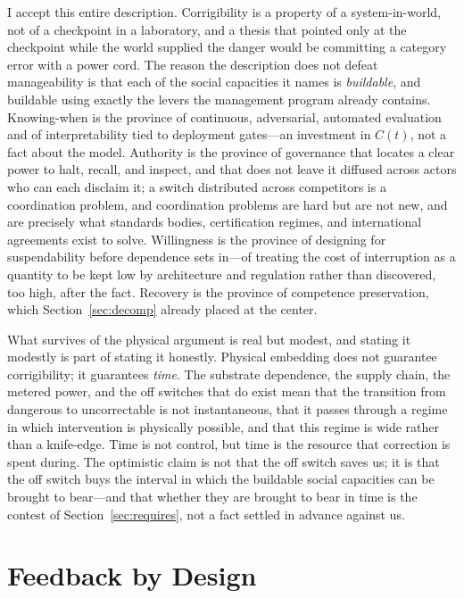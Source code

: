 \documentclass[11pt]{article}
\begin{document}
I accept this entire description. Corrigibility is a property of a system-in-world, not of a checkpoint in a laboratory, and a thesis that pointed only at the checkpoint while the world supplied the danger would be committing a category error with a power cord. The reason the description does not defeat manageability is that each of the social capacities it names is \emph{buildable}, and buildable using exactly the levers the management program already contains. Knowing-when is the province of continuous, adversarial, automated evaluation and of interpretability tied to deployment gates---an investment in $C(t)$, not a fact about the model. Authority is the province of governance that locates a clear power to halt, recall, and inspect, and that does not leave it diffused across actors who can each disclaim it; a switch distributed across competitors is a coordination problem, and coordination problems are hard but are not new, and are precisely what standards bodies, certification regimes, and international agreements exist to solve. Willingness is the province of designing for suspendability before dependence sets in---of treating the cost of interruption as a quantity to be kept low by architecture and regulation rather than discovered, too high, after the fact. Recovery is the province of competence preservation, which Section~\ref{sec:decomp} already placed at the center.

What survives of the physical argument is real but modest, and stating it modestly is part of stating it honestly. Physical embedding does not guarantee corrigibility; it guarantees \emph{time}. The substrate dependence, the supply chain, the metered power, and the off switches that do exist mean that the transition from dangerous to uncorrectable is not instantaneous, that it passes through a regime in which intervention is physically possible, and that this regime is wide rather than a knife-edge. Time is not control, but time is the resource that correction is spent during. The optimistic claim is not that the off switch saves us; it is that the off switch buys the interval in which the buildable social capacities can be brought to bear---and that whether they are brought to bear in time is the contest of Section~\ref{sec:requires}, not a fact settled in advance against us.

\section{Feedback by Design}
\label{sec:feedback}
\end{document}

